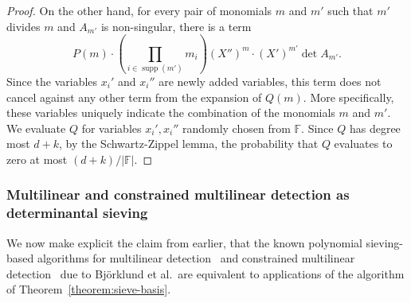 \documentclass[10pt,a4paper]{article}
\newcommand{\F}{\ensuremath{\mathbb F}\xspace}
\DeclareMathOperator{\supp}{supp}
\begin{document}
\begin{proof}
  On the other hand, for every pair of monomials $m$ and $m'$ such that $m'$ divides $m$ and $A_{m'}$ is non-singular, there is a term
  \[
    P(m) \cdot \left( \prod_{i \in \supp(m')} m_i\right) (X'')^m  \cdot (X')^{m'} \det A_{m'}    .
  \]
  Since the variables $x_i'$ and $x_i''$ are newly added variables,
  this term does not cancel against any other term from the expansion
  of $Q(m)$.
  More specifically, these variables uniquely indicate the
  combination of the monomials $m$ and $m'$. 
  We evaluate $Q$ for variables $x_i', x_i''$ randomly chosen from $\F$.
  Since $Q$ has degree most $d + k$, by the Schwartz-Zippel lemma, the probability that $Q$ evaluates to zero at most $(d + k) / |\F|$.
\end{proof}

\subsubsection{Multilinear and constrained multilinear detection
  as determinantal sieving}
\label{ssec:mld-compare}

We now make explicit the claim from earlier, that the known
polynomial sieving-based algorithms for multilinear detection~\cite{Bjorklund14detsum,BjorklundHKK17narrow}
and constrained multilinear detection~\cite{BjorklundKK16}
due to Björklund et al.\ are equivalent to 
applications of the algorithm of Theorem~\ref{theorem:sieve-basis}.
\end{document}
